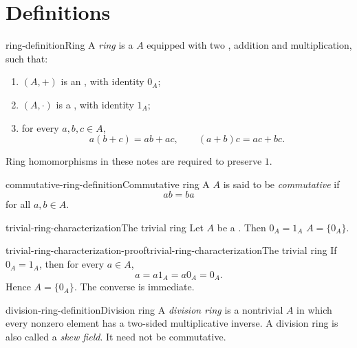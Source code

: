 \documentclass[preview]{standalone}
\begin{document}
\genpage

\section{Definitions}

\begin{snippetdefinition}{ring-definition}{Ring}
    A \emph{ring} is a \set \(A\) equipped with two
    , addition and multiplication, such that:
    \begin{enumerate}
        \item \((A,+)\) is an \abeliangroup, with identity \(0_A\);
        \item \((A,\cdot)\) is a \monoid, with identity \(1_A\);
        \item for every \(a,b,c\in A\),
        \[
            a(b+c)=ab+ac,
            \qquad
            (a+b)c=ac+bc.
        \]
    \end{enumerate}
    Ring homomorphisms in these notes are required to preserve \(1\).
\end{snippetdefinition}

\begin{snippetdefinition}{commutative-ring-definition}{Commutative ring}
    A \ring \(A\) is said to be \emph{commutative} if
    \[
        ab=ba
    \]
    for all \(a,b\in A\).
\end{snippetdefinition}

\begin{snippetproposition}{trivial-ring-characterization}{The trivial ring}
    Let \(A\) be a \ring. Then \(0_A=1_A\) \ifandonlyif
    \(A=\{0_A\}\).
\end{snippetproposition}

\begin{snippetproof}{trivial-ring-characterization-proof}{trivial-ring-characterization}{The trivial ring}
    If \(0_A=1_A\), then for every \(a\in A\),
    \[
        a=a1_A=a0_A=0_A.
    \]
    Hence \(A=\{0_A\}\). The converse is immediate.
\end{snippetproof}


\begin{snippetdefinition}{division-ring-definition}{Division ring}
    A \emph{division ring} is a nontrivial \ring \(A\) in which every
    nonzero element has a two-sided multiplicative inverse. A division ring
    is also called a \emph{skew field}. It need not be commutative.
\end{snippetdefinition}
\end{document}
